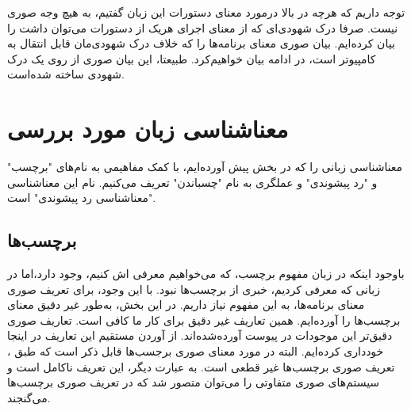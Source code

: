 توجه داریم که هر‌چه در بالا در‌مورد معنای دستورات این زبان گفتیم، به هیچ وجه صوری نیست. صرفا درک شهودی‌ای که از معنای اجرای هر‌یک از دستورات می‌توان داشت را بیان کرده‌ایم. بیان صوری معنای برنامه‌ها را که خلاف درک شهودی‌مان قابل انتقال به کامپیوتر‌ است، در ادامه بیان خواهیم‌کرد. طبیعتا، این بیان صوری از روی یک درک شهودی ساخته شده‌است.

\section{معناشناسی زبان مورد بررسی‬}
معناشناسی زبانی را که در بخش پیش آورده‌ایم، با کمک مفاهیمی به نام‌های "برچسب" و "رد پیشوندی" و عملگری به نام "چسباندن" تعریف می‌کنیم. نام این معناشناسی "معناشناسی رد پیشوندی" است.\\

\subsection{برچسب‌ها}

با‌وجود اینکه در زبان  مفهوم برچسب، که می‌خواهیم معرفی اش کنیم، وجود دارد،اما در زبانی که معرفی کردیم، خبری از برچسب‌ها نبود. با این وجود، برای تعریف صوری معنای برنامه‌ها، به این مفهوم نیاز داریم. در این بخش، به‌طور غیر دقیق معنای برچسب‌ها را آورده‌ایم. همین تعاریف غیر دقیق برای کار ما کافی است. تعاریف صوری دقیق‌تر این موجودات در پیوست \cite{calcul} آورده‌شده‌اند. از آوردن مستقیم این تعاریف در اینجا خود‌داری کرده‌ایم. البته در مورد معنای صوری برجسب‌ها قابل ذکر است که طبق \cite{cousotbook}، تعریف صوری برچسب‌ها غیر قطعی است. به عبارت دیگر، این تعریف ناکامل است و سیستم‌های صوری متفاوتی را می‌توان متصور شد که در تعریف صوری برچسب‌ها می‌گنجند.

